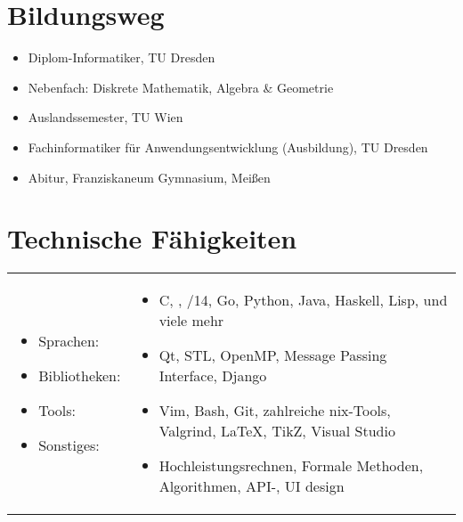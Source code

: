 \vspace{-0.2cm}
\customhrule
\section*{Bildungsweg}
\begin{itemize}
	\item {}
		Diplom-Informatiker, TU Dresden
	\item \hspace{1em} Nebenfach: Diskrete Mathematik, Algebra \& Geometrie
	\item {}
		Auslandssemester, TU Wien
	\item {}
		Fachinformatiker f\"ur Anwendungsentwicklung (Ausbildung), TU Dresden
	\item {}
		Abitur, Franziskaneum Gymnasium, Mei\ss en
\end{itemize}

\pagebreak
\section*{Technische F\"ahigkeiten}
\vspace{0.1cm} %
\begin{tabular}{l l}
	\begin{minipage}{0.18\textwidth}
		\begin{itemize}
			\item Sprachen:
			\item Bibliotheken:
			\item Tools:
			\item Sonstiges:
		\end{itemize}
	\end{minipage}
	&
	\begin{minipage}{0.80\textwidth}
		\begin{itemize}
			\item C, \cpp, \cpp11/14, Go, Python, Java, Haskell, Lisp, und viele mehr
			\item Qt, STL, OpenMP, Message Passing Interface, Django
			\item Vim, Bash, Git, zahlreiche \textasteriskcentered{}nix-Tools, Valgrind, \LaTeX, TikZ, Visual Studio
			\item Hochleistungsrechnen, Formale Methoden, Algorithmen, API-, UI design
		\end{itemize}
	\end{minipage}
\end{tabular}


